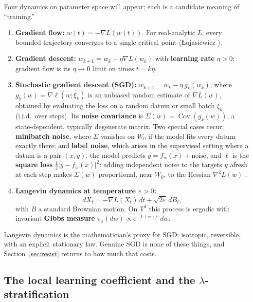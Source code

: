 \documentclass[11pt]{amsart}
\theoremstyle{plain}
\theoremstyle{definition}
\newcommand{\T}{\mathbb{T}}
\begin{document}
Four dynamics on parameter space will appear; each is a candidate meaning of ``training.''
\begin{enumerate}
\item \textbf{Gradient flow:} $\dot w(t) = -\nabla L(w(t))$. For real-analytic $L$, every bounded trajectory converges to a single critical point (\L{}ojasiewicz \cite{lojasiewicz1984}).
\item \textbf{Gradient descent:} $w_{k+1} = w_k - \eta \nabla L(w_k)$ with \textbf{learning rate} $\eta > 0$; gradient flow is its $\eta \to 0$ limit on times $t = k\eta$.
\item \textbf{Stochastic gradient descent (SGD):} $w_{k+1} = w_k - \eta \, g_k(w_k)$, where $g_k(w) = \nabla \ell(w; \xi_k)$ is an unbiased random estimate of $\nabla L(w)$, obtained by evaluating the loss on a random datum or small batch $\xi_k$ (i.i.d.\ over steps). Its \textbf{noise covariance} is $\Sigma(w) = \operatorname{Cov}(g_k(w))$, a state-dependent, typically degenerate matrix. Two special cases recur: \textbf{minibatch noise}, where $\Sigma$ vanishes on $W_0$ if the model fits every datum exactly there; and \textbf{label noise}, which arises in the supervised setting where a datum is a pair $(x, y)$, the model predicts $y = f_w(x) + \text{noise}$, and $\ell$ is the \textbf{square loss} $\tfrac12 |y - f_w(x)|^2$: adding independent noise to the targets $y$ afresh at each step makes $\Sigma(w)$ proportional, near $W_0$, to the Hessian $\nabla^2 L(w)$ \cite{blanc2020,damian2021}.
\item \textbf{Langevin dynamics at temperature $\varepsilon > 0$:}
\begin{equation}\label{eq:langevin}
   dX_t = -\nabla L(X_t)\, dt + \sqrt{2\varepsilon}\, dB_t,
\end{equation}
with $B$ a standard Brownian motion. On $\T^d$ this process is ergodic with invariant \textbf{Gibbs measure} $\pi_\varepsilon(dw) \propto e^{-L(w)/\varepsilon} dw$.
\end{enumerate}
Langevin dynamics is the mathematician's proxy for SGD: isotropic, reversible, with an explicit stationary law. Genuine SGD is none of these things, and Section~\ref{sec:resist} returns to how much that costs.

\subsection{The local learning coefficient and the \texorpdfstring{$\lambda$}{lambda}-stratification}\label{sec:llc}
\end{document}
